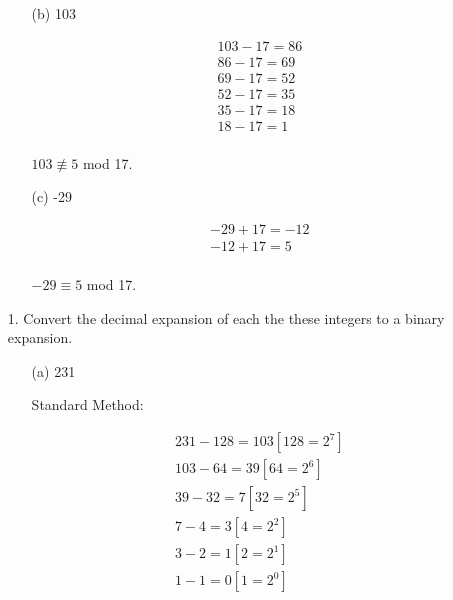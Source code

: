 \documentclass[12pt]{article}
\newenvironment{answer}{\larger[2]}{}
\begin{document}
\begin{enumerate}
\begin{enumerate}
    \item[(b)] 103
    
    \begin{answer}
        \begin{align*}
            103 - 17 = 86 \\
            86 - 17 = 69 \\
            69 - 17 = 52 \\
            52 - 17 = 35 \\
            35 - 17 = 18 \\
            18 - 17 = 1 \\
        \end{align*}

        $103 \not \equiv 5$ mod 17.
    \end{answer}
    
    \item[(c)] -29
    
    \begin{answer}
        \begin{align*}
            -29 + 17 = -12 \\
            -12 + 17 = 5 \\
        \end{align*}

        $-29 \equiv 5$ mod 17.
    \end{answer}
    
\end{enumerate}
\newpage


\item[1.] Convert the decimal expansion of each the these integers to a binary expansion.

\begin{enumerate}
    \item[(a)] 231
    
    Standard Method:

    \begin{align*}
        231 - 128 = 103 [128 = 2^7]\\
        103 - 64 = 39 [64 = 2^6]\\
        39 - 32 = 7 [32 = 2^5]\\
        7 - 4 = 3 [4 = 2^2]\\
        3 - 2 = 1 [2 = 2^1]\\
        1 - 1 = 0 [1 = 2^0]\\
    \end{align*}


\end{enumerate}
\end{enumerate}
\end{document}

